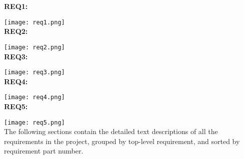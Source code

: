\textbf{REQ1:}

\texttt{[image: req1.png]}\\

\textbf{REQ2:}

\texttt{[image: req2.png]}\\

\textbf{REQ3:}

\texttt{[image: req3.png]}\\

\textbf{REQ4:}

\texttt{[image: req4.png]}\\

\textbf{REQ5:}

\texttt{[image: req5.png]}\\

The following sections contain the detailed text descriptions of all the requirements in the project, grouped by top-level requirement, and sorted by requirement part number.










